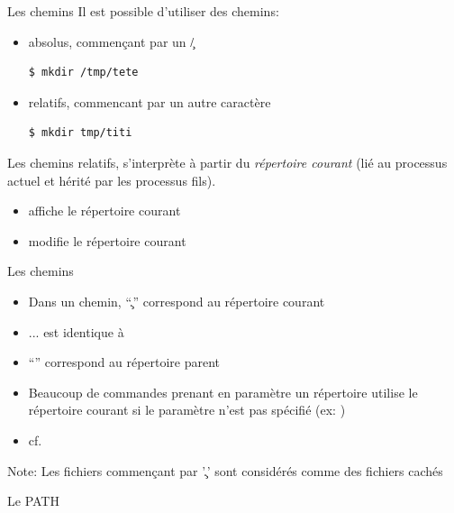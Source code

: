 \begin{frame}[fragile=singleslide]{Les chemins}
  Il est possible d'utiliser des chemins:
  \begin{itemize}
  \item absolus, commençant par un \c{/}
    \begin{lstlisting}
$ mkdir /tmp/tete
    \end{lstlisting}
  \item relatifs, commencant par un autre caractère
    \begin{lstlisting}
$ mkdir tmp/titi
    \end{lstlisting}
  \end{itemize}
  Les  chemins  relatifs, s'interprète  à  partir du  \emph{répertoire
    courant}  (lié au  processus actuel  et hérité  par  les processus
  fils).
  \begin{itemize}
  \item {} affiche le répertoire courant
  \item {} modifie le répertoire courant
  \end{itemize}
\end{frame}

\begin{frame}[fragile=singleslide]{Les chemins}
  \begin{itemize}
  \item Dans un chemin, ``\c{.}'' correspond au répertoire courant
  \item ...  est identique à 
  \item ``'' correspond au répertoire parent
  \item  Beaucoup de  commandes  prenant en  paramètre un  répertoire
    utilise le  répertoire courant si le paramètre  n'est pas spécifié
    (ex: )
  \item  cf. 
  \end{itemize}
  Note: Les fichiers commençant  par '\c{.}' sont considérés comme des
  fichiers cachés
\end{frame}

\begin{frame}[fragile=singleslide]{Le PATH}
\end{frame}

